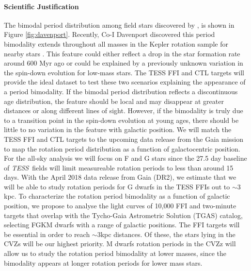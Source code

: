 \documentclass[letterpaper,12pt,preprint]{hack_aastex}
\newcommand{\TESS}{{\it TESS}}
\begin{document}
\paragraph{Scientific Justification}

The bimodal period distribution among field stars discovered by
\citet{mcquillan2013}, is shown in Figure \ref{fig:davenport}.
Recently, Co-I Davenport discovered this period bimodality extends throughout
all masses in the Kepler rotation sample for nearby stars
\citep{davenport2017}.
This feature could either reflect a drop in the star formation rate around 600
Myr ago or could be explained by a previously unknown variation in the
spin-down evolution for low-mass stars.
The TESS FFI and CTL targets will provide the ideal dataset to test these two
scenarios explaining the appearance of a period bimodality.
If the bimodal period distribution reflects a discontinuous age distribution,
the feature should be local and may disappear at greater distances or along
different lines of sight.
However, if the bimodality is truly due to a transition point in the spin-down
evolution at young ages, there should be little to no variation in the feature
with galactic position.
We will match the TESS FFI and CTL targets to the upcoming data
release from the Gaia mission \citep{perryman2001} to map the rotation period
distribution as a function of galactocentric position.
For the all-sky analysis we will focus on F and G stars since the 27.5 day
baseline of \TESS\ fields will limit measureable rotation periods to less than
around 15 days.
With the April 2018 data release from Gaia (DR2), we estimate that we will be
able to study rotation periods for G dwarfs in the TESS FFIs out to $\sim$3
kpc.
To characterize the rotation period bimodality as a function of galactic
position, we propose to analyse the light curves of 10,000 FFI and two-minute
targets that overlap with the Tycho-Gaia Astrometric Solution (TGAS) catalog,
selecting FGKM dwarfs with a range of galactic positions.
The FFI targets will be essential in order to reach $\sim$3kpc distances.
Of these, the stars lying in the CVZs will be our highest priority.
M dwarfs rotation periods in the CVZz will allow us to study the rotation
period bimodality at lower masses, since the bimodality appears at longer
rotation periods for lower mass stars.

\end{document}
